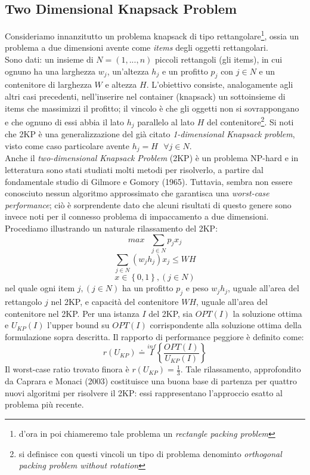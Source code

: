 \documentclass[12pt,a4paper,openright,twoside]{report}
\begin{document}
\subsection{Two Dimensional Knapsack Problem}
Consideriamo innanzitutto un problema knapsack di tipo rettangolare\footnote{d'ora in poi chiameremo tale problema un \textit{rectangle packing problem}}, ossia un problema a due dimensioni avente come \textit{items} degli oggetti rettangolari. \\ Sono dati: un insieme di $N = (1,...,n)$ piccoli rettangoli (gli items), in cui ognuno ha una larghezza $w_{j}$, un'altezza $h_{j}$ e un profitto $p_{j}$ con $j \in N$ e un contenitore di larghezza $W$ e altezza $H$. L'obiettivo consiste, analogamente agli altri casi precedenti, nell'inserire nel container (knapsack) un sottoinsieme di items che massimizzi il profitto; il vincolo \`{e} che gli oggetti non si sovrappongano e che ognuno di essi abbia il lato $h_{j}$ parallelo al lato $H$ del contenitore\footnote{si definisce con questi vincoli un tipo di problema denominto \textit{orthogonal packing problem without rotation}}. Si noti che 2KP \`{e} una generalizzazione del gi\`{a} citato \textit{1-dimensional
Knapsack problem}, visto come caso particolare avente $h_{j} = H \mbox{  } \forall j \in N$.\\
Anche il \textit{two-dimensional Knapsack Problem} (2KP) \`{e} un problema NP-hard e in letteratura sono stati studiati molti metodi per risolverlo, a partire dal fondamentale studio di Gilmore e Gomory (1965). Tuttavia, sembra non essere conosciuto nessun algoritmo approssimato che garantisca una \textit{worst-case performance}; ci\`{o} \`{e} sorprendente dato che alcuni risultati di questo genere sono invece noti per il connesso problema di impaccamento a due dimensioni.
Procediamo illustrando un naturale rilassamento del 2KP:
$$max \mbox{ } \sum_{j \in N}p_{j} x_{j}$$
$$\sum_{j \in N}(w_{j}h_{j})x_{j} \leq WH$$ 
$$x \in \left\lbrace 0,1 \right\rbrace, (j \in N)$$
nel quale ogni item $j, ( j \in N )$ ha un profitto $p_{j}$ e peso $w_{j}h_{j}$, uguale all'area del rettangolo $j$ nel 2KP, e capacit\`{a} del contenitore $WH$, uguale all'area del contenitore nel 2KP. Per una istanza $I$ del 2KP, sia $OPT(I)$ la soluzione ottima e $U_{KP}( I )$ l'upper bound su $OPT(I)$ corrispondente alla soluzione ottima della formulazione sopra descritta. Il rapporto di performance peggiore \`{e} definito come:
$$ r(U_{KP}) \doteq \stackrel{inf}{I} \left\lbrace \dfrac{OPT(I)}{U_{KP}(I)} \right\rbrace $$
Il worst-case ratio trovato finora \`{e} $r(U_{KP}) = \frac{1}{3}$. Tale rilassamento, approfondito da Caprara e Monaci (2003) costituisce una buona base di partenza per quattro nuovi algoritmi per risolvere il 2KP: essi rappresentano l'approccio esatto al problema pi\`{u} recente.\\
\end{document}
